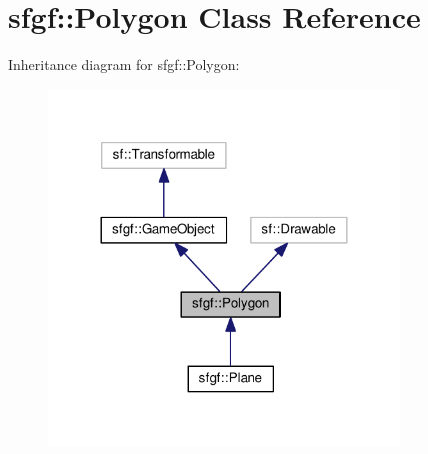 \hypertarget{classsfgf_1_1Polygon}{}\section{sfgf\+:\+:Polygon Class Reference}
\label{classsfgf_1_1Polygon}


Inheritance diagram for sfgf\+:\+:Polygon\+:\nopagebreak
\begin{figure}[H]
\begin{center}
\leavevmode
\includegraphics[width=264pt]{classsfgf_1_1Polygon__inherit__graph}
\end{center}
\end{figure}
